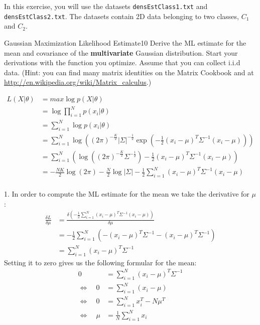 \newif\ifvimbug
\vimbugfalse

\ifvimbug

\fi

In this exercise, you will use the datasets \texttt{densEstClass1.txt} 
and \texttt{densEstClass2.txt}. The datasets contain 2D data belonging
to two classes, $C_1$ and $C_2$.

\begin{questions}


\begin{question}{Gaussian Maximization Likelihood Estimate}{10}
Derive the ML estimate for the mean and covariance of the \textbf{multivariate} Gaussian distribution. Start your derivations with the function you optimize. Assume that you can collect i.i.d data. (Hint: you can find many matrix identities on the Matrix Cookbook and at \url{http://en.wikipedia.org/wiki/Matrix_calculus}.)

\begin{answer}

\begin{align*}
L(X | \theta ) &= max \log p(X|\theta ) \\
&= \log \prod_{i=1}^{N} p(x_i|\theta ) \\
&= \sum_{i=1}^{N} \log p(x_i|\theta ) \\
&= \sum_{i=1}^{N} \log ( (2\pi )^{-\frac{K}{2}} |\Sigma |^{-\frac{1}{2}} \exp (-\frac{1}{2} (x_i-\mu )^{T} \Sigma^{-1}(x_i-\mu ))) \\
&= \sum_{i=1}^{N} ( \log ((2\pi )^{-\frac{K}{2}}\Sigma^{-\frac{1}{2}})-\frac{1}{2} (x_i-\mu )^T \Sigma^{-1}(x_i-\mu) ) \\
&= -\frac{N K}{2} \log (2\pi )-\frac{N}{2} \log |\Sigma |-\frac{1}{2}\sum_{i=1}^{N}(x_i-\mu )^T \Sigma^{-1}(x_i-\mu )\\
\end{align*}

1. In order to compute the ML estimate for the mean we take the derivative for $\mu $:
\begin{align*}
\frac{\delta L}{\delta \mu} &= \frac{\delta(-\frac{1}{2}\sum_{i=1}^{N}(x_i-\mu )^T \Sigma^{-1} (x_i-\mu ))}{\delta \mu} \\
&= -\frac{1}{2} \sum_{i=1}^{N}(-(x_i-\mu )^T \Sigma^{-1}-(x_i-\mu )^T \Sigma^{-1}) \\
&= \sum_{i=1}^{N}(x_i-\mu )^T\Sigma^{-1}
\end{align*}
Setting it to zero gives us the following formular for the mean:
\begin{align*}
0 &= \sum_{i=1}^{N}(x_i-\mu )^T\Sigma^{-1} \\
\Leftrightarrow \quad 0 &= \sum_{i=1}^{N}(x_i-\mu ) \\
\Leftrightarrow \quad 0 &= \sum_{i=1}^{N}x_i^T-N\mu^T \\
\Leftrightarrow \quad \mu &= \frac{1}{N}\sum_{i=1}^{N}x_i 
\end{align*}


\end{answer}
\end{question}
\end{questions}
